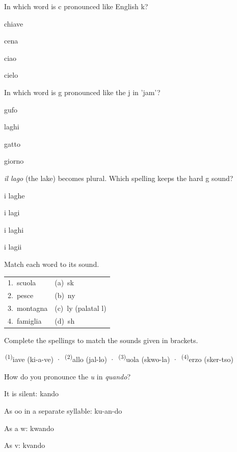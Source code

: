 \documentclass[11pt,a4paper,twoside,openright]{book}
\newcommand{\clozeblank}[1]{\underline{\hspace{2.4cm}}\textsuperscript{\,(#1)}}
\begin{document}
\begin{exercises}
\item\label{ex:c-and-g-1}\relax In which word is c pronounced like English k?\par\nopagebreak\begin{options}
\item\relax chiave
\item\relax cena
\item\relax ciao
\item\relax cielo
\end{options}
\item\label{ex:c-and-g-2}\relax In which word is g pronounced like the j in 'jam'?\par\nopagebreak\begin{options}
\item\relax gufo
\item\relax laghi
\item\relax gatto
\item\relax giorno
\end{options}
\item\label{ex:c-and-g-3}\relax \textit{il lago} (the lake) becomes plural. Which spelling keeps the hard g sound?\par\nopagebreak\begin{options}
\item\relax i laghe
\item\relax i lagi
\item\relax i laghi
\item\relax i lagii
\end{options}
\item\label{ex:c-and-g-4}\relax Match each word to its sound.\par\smallskip\begin{tabularx}{\linewidth}{@{}L L@{}}
1.\ scuola & (a)\ sk \\
2.\ pesce & (b)\ ny \\
3.\ montagna & (c)\ ly (palatal l) \\
4.\ famiglia & (d)\ sh \\
\end{tabularx}
\item\label{ex:c-and-g-5}\relax Complete the spellings to match the sounds given in brackets.\par\smallskip\begingroup\setlength{\parindent}{0pt}\clozeblank{1}iave (ki-a-ve) · \clozeblank{2}allo (jal-lo) · \clozeblank{3}uola (skwo-la) · \clozeblank{4}erzo (sker-tso)\par\endgroup
\item\label{ex:c-and-g-6}\relax How do you pronounce the \textit{u} in \textit{quando}?\par\nopagebreak\begin{options}
\item\relax It is silent: kando
\item\relax As oo in a separate syllable: ku-an-do
\item\relax As a w: kwando
\item\relax As v: kvando
\end{options}
\end{exercises}
\end{document}
